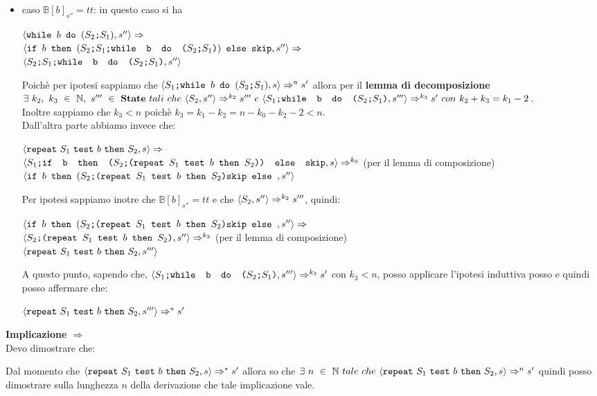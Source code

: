 {\begin{itemize}
		\item caso $\mathbb{B}[b]_{s''}=tt$: in questo caso si ha 
		\begin{center}
		$\confSs{\wbS{b}{(\concat{$S_2$}{$S_1$})}}{s''}\Rar{}$\\
		$\confSs{\ifABC{b}{(\concat{\concat{$S_2$}{$S_1$}}
		{\wbS{b}{(\concat{$S_2$}{$S_1$})}})}{\skipistr}}{s''}\Rar{}$\\
		$\confSs{\concat{\concat{$S_2$}{$S_1$}}
		{\wbS{b}{(\concat{$S_2$}{$S_1$})}}}{s''}$
		\end{center}
		Poichè per ipotesi sappiamo che $\confSs{\PDef{}}{s}\Rar{n}s'$ allora
		per il \textbf{lemma di decomposizione} \\ $\exists{}~k_2,~k_3~\in~
		\mathbb{N},~s'''~\in~\states{}~tali~che~\confSs{S_2}{s''}\Rar{k_2}s'''~e
		~\confSs{\concat{$S_1$}{\wbS{b}{(\concat{$S_2$}{$S_1$})}}}{s'''}
		\Rar{k_3}s'~con~k_2+k_3=k_1-2$.\\
		Inoltre sappiamo che $k_3<n$ poichè $k_3=k_1-k_2=n-k_0-k_2-2<n$.\\
		Dall'altra parte abbiamo invece che:
		\begin{center}
		$\confSs{\repeatSbS{S_1}{b}{S_2}}{s}\Rar{}$\\
		$\confSs{\concat{$S_1$}{\ifABC{b}{(\concat{$S_2$}
		{(\repeatSbS{$S_1$}{$b$}{$S_2$})})}{\skipistr}}}{s}\Rar{k_0}$ (per il
		lemma di composizione)\\
		$\confSs{\ifABC{b}{(\concat{$S_2$}
		{(\repeatSbS{$S_1$}{$b$}{$S_2$})}{\skipistr}}}{s''}$\\
		\end{center}
		Per ipotesi sappiamo inotre che $\mathbb{B}[b]_{s''}=tt$ e che 
		$\confSs{S_2}{s''}\Rar{k_2}s'''$, quindi:
		\begin{center}
		$\confSs{\ifABC{b}{(\concat{$S_2$}
		{(\repeatSbS{$S_1$}{$b$}{$S_2$})}{\skipistr}}}{s''}\Rar{}$\\
		$\confSs{\concat{$S_2$}{(\repeatSbS{$S_1$}{$b$}{$S_2$})}}{s''}\Rar{k_2}$
		(per il lemma di composizione)\\$\confSs{\repeatSbS{S_1}{b}{S_2}}{s'''}$
		\end{center}
		A questo punto, sapendo che,
		$\confSs{\concat{$S_1$}{\wbS{b}{(\concat{$S_2$}{$S_1$})}}}{s'''}
		\Rar{k_3}s'$ con $k_3<n$, posso applicare l'ipotesi induttiva posso e
		quindi posso affermare che:
		\begin{center}
		$\confSs{\repeatSbS{S_1}{b}{S_2}}{s'''}\Rar{*}s'$
		\end{center}
	\end{itemize}

	\textbf{Implicazione $\Longrightarrow$}\\
	Devo dimostrare che:
	\begin{center}
	\exThreeLtR{}
	\end{center}
	Dal momento che $\confSs{\repeatSbS{S_1}{b}{S_2}}{s}\Rar{*}s'$ allora so che
	$\exists{}~n~\in~\mathbb{N}~tale~che~
	\confSs{\repeatSbS{S_1}{b}{S_2}}{s}\Rar{n}s'$ quindi posso dimostrare sulla
	lunghezza $n$ della derivazione che tale implicazione vale.
	
	

}